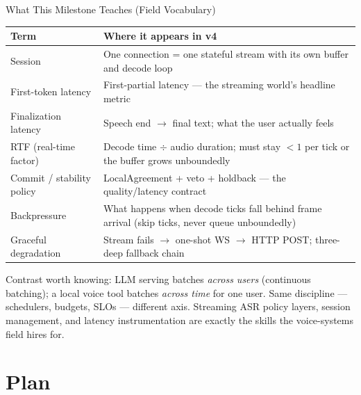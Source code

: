 \documentclass{beamer}
\begin{document}
\begin{frame}{What This Milestone Teaches (Field Vocabulary)}
    \vspace{-0.3em}
    \begin{table}
    \centering\scriptsize
    \begin{tabular}{@{} l p{6.2cm} @{}}
        \toprule
        \textbf{Term} & \textbf{Where it appears in v4} \\
        \midrule
        Session & One connection = one stateful stream with its own buffer
                  and decode loop \\
        First-token latency & First-partial latency --- the streaming world's
                  headline metric \\
        Finalization latency & Speech end $\rightarrow$ final text; what the
                  user actually feels \\
        RTF (real-time factor) & Decode time $\div$ audio duration; must stay
                  $<1$ per tick or the buffer grows unboundedly \\
        Commit / stability policy & LocalAgreement + veto + holdback --- the
                  quality/latency contract \\
        Backpressure & What happens when decode ticks fall behind frame
                  arrival (skip ticks, never queue unboundedly) \\
        Graceful degradation & Stream fails $\rightarrow$ one-shot WS
                  $\rightarrow$ HTTP POST; three-deep fallback chain \\
        \bottomrule
    \end{tabular}
    \end{table}

    \scriptsize
    Contrast worth knowing: LLM serving batches \emph{across users} (continuous
    batching); a local voice tool batches \emph{across time} for one user. Same
    discipline --- schedulers, budgets, SLOs --- different axis. Streaming ASR
    policy layers, session management, and latency instrumentation are exactly
    the skills the voice-systems field hires for.
\end{frame}


\section{Plan}
\end{document}
